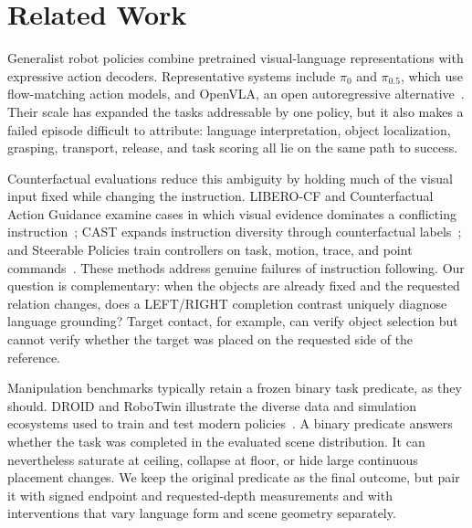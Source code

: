 \section{Related Work}
\label{sec:related}

Generalist robot policies combine pretrained visual-language representations with expressive action decoders. Representative systems include $\pi_0$ and $\pi_{0.5}$, which use flow-matching action models, and OpenVLA, an open autoregressive alternative~\cite{black2024pi0,black2025pi05,kim2024openvla}. Their scale has expanded the tasks addressable by one policy, but it also makes a failed episode difficult to attribute: language interpretation, object localization, grasping, transport, release, and task scoring all lie on the same path to success.

Counterfactual evaluations reduce this ambiguity by holding much of the visual input fixed while changing the instruction. LIBERO-CF and Counterfactual Action Guidance examine cases in which visual evidence dominates a conflicting instruction~\cite{fang2026cag}; CAST expands instruction diversity through counterfactual labels~\cite{glossop2025cast}; and Steerable Policies train controllers on task, motion, trace, and point commands~\cite{chen2026steerable}. These methods address genuine failures of instruction following. Our question is complementary: when the objects are already fixed and the requested relation changes, does a LEFT/RIGHT completion contrast uniquely diagnose language grounding? Target contact, for example, can verify object selection but cannot verify whether the target was placed on the requested side of the reference.

Manipulation benchmarks typically retain a frozen binary task predicate, as they should. DROID and RoboTwin illustrate the diverse data and simulation ecosystems used to train and test modern policies~\cite{khazatsky2024droid,mu2025robotwin}. A binary predicate answers whether the task was completed in the evaluated scene distribution. It can nevertheless saturate at ceiling, collapse at floor, or hide large continuous placement changes. We keep the original predicate as the final outcome, but pair it with signed endpoint and requested-depth measurements and with interventions that vary language form and scene geometry separately.
